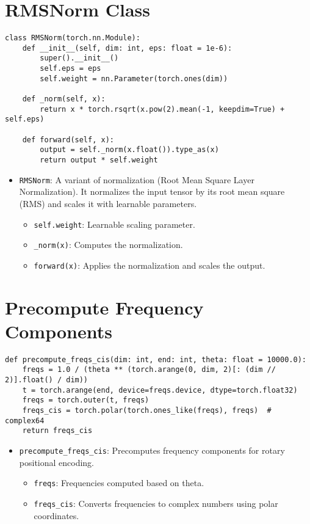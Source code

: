 \section{RMSNorm Class}

\begin{lstlisting}
class RMSNorm(torch.nn.Module):
    def __init__(self, dim: int, eps: float = 1e-6):
        super().__init__()
        self.eps = eps
        self.weight = nn.Parameter(torch.ones(dim))

    def _norm(self, x):
        return x * torch.rsqrt(x.pow(2).mean(-1, keepdim=True) + self.eps)

    def forward(self, x):
        output = self._norm(x.float()).type_as(x)
        return output * self.weight
\end{lstlisting}

\begin{itemize}
    \item \texttt{RMSNorm}: A variant of normalization (Root Mean Square Layer Normalization). It normalizes the input tensor by its root mean square (RMS) and scales it with learnable parameters.
    \begin{itemize}
        \item \texttt{self.weight}: Learnable scaling parameter.
        \item \texttt{\_norm(x)}: Computes the normalization.
        \item \texttt{forward(x)}: Applies the normalization and scales the output.
    \end{itemize}
\end{itemize}

\section{Precompute Frequency Components}

\begin{lstlisting}
def precompute_freqs_cis(dim: int, end: int, theta: float = 10000.0):
    freqs = 1.0 / (theta ** (torch.arange(0, dim, 2)[: (dim // 2)].float() / dim))
    t = torch.arange(end, device=freqs.device, dtype=torch.float32)
    freqs = torch.outer(t, freqs)
    freqs_cis = torch.polar(torch.ones_like(freqs), freqs)  # complex64
    return freqs_cis
\end{lstlisting}

\begin{itemize}
    \item \texttt{precompute_freqs_cis}: Precomputes frequency components for rotary positional encoding.
    \begin{itemize}
        \item \texttt{freqs}: Frequencies computed based on theta.
        \item \texttt{freqs\_cis}: Converts frequencies to complex numbers using polar coordinates.
    \end{itemize}
\end{itemize}

